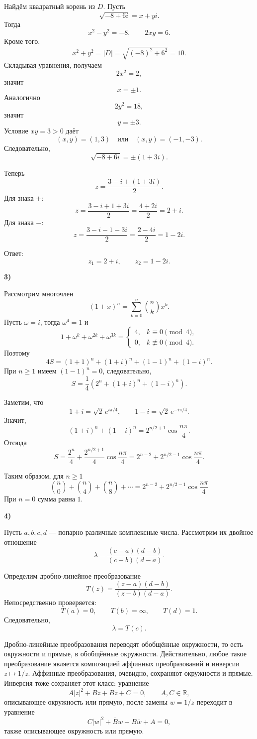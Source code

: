 \documentclass[12pt,a4paper]{article}
\newcommand{\soli}[1]{%
  \par\vspace{0.15\baselineskip}%
  \noindent\textbf{#1)}\ %
  \ignorespaces                     %
}
\begin{document}
Найдём квадратный корень из $D$. Пусть
\[
\sqrt{-8+6i}=x+yi.
\]
Тогда
\[
x^2-y^2=-8,
\qquad
2xy=6.
\]
Кроме того,
\[
x^2+y^2=|D|=\sqrt{(-8)^2+6^2}=10.
\]
Складывая уравнения, получаем
\[
2x^2=2,
\]
значит
\[
x=\pm 1.
\]
Аналогично
\[
2y^2=18,
\]
значит
\[
y=\pm 3.
\]
Условие $xy=3>0$ даёт
\[
(x,y)=(1,3)
\quad\text{или}\quad
(x,y)=(-1,-3).
\]
Следовательно,
\[
\sqrt{-8+6i}=\pm(1+3i).
\]

Теперь
\[
z=\frac{3-i\pm(1+3i)}{2}.
\]
Для знака $+$:
\[
z=\frac{3-i+1+3i}{2}
=
\frac{4+2i}{2}
=
2+i.
\]
Для знака $-$:
\[
z=\frac{3-i-1-3i}{2}
=
\frac{2-4i}{2}
=
1-2i.
\]

Ответ:
\[
\boxed{
z_1=2+i,
\qquad
z_2=1-2i.
}
\]

\soli{3}

Рассмотрим многочлен
\[
(1+x)^n=\sum_{k=0}^n \binom nk x^k.
\]
Пусть $\omega=i$, тогда $\omega^4=1$ и
\[
1+\omega^k+\omega^{2k}+\omega^{3k}
=
\begin{cases}
4,& k\equiv 0\pmod 4,\\
0,& k\not\equiv 0\pmod 4.
\end{cases}
\]
Поэтому
\[
4S
=
(1+1)^n+(1+i)^n+(1-1)^n+(1-i)^n.
\]
При $n\ge 1$ имеем $(1-1)^n=0$, следовательно,
\[
S=\frac14\left(2^n+(1+i)^n+(1-i)^n\right).
\]

Заметим, что
\[
1+i=\sqrt2\, e^{i\pi/4},
\qquad
1-i=\sqrt2\, e^{-i\pi/4}.
\]
Значит,
\[
(1+i)^n+(1-i)^n
=
2^{n/2+1}\cos\frac{n\pi}{4}.
\]
Отсюда
\[
S
=
\frac{2^n}{4}
+
\frac{2^{n/2+1}}{4}\cos\frac{n\pi}{4}
=
2^{n-2}
+
2^{n/2-1}\cos\frac{n\pi}{4}.
\]

Таким образом, для $n\ge 1$
\[
\boxed{
\binom n0+\binom n4+\binom n8+\cdots
=
2^{n-2}+2^{n/2-1}\cos\frac{n\pi}{4}
}
\]
При $n=0$ сумма равна $1$.

\newpage

\soli{4}

Пусть $a,b,c,d$ — попарно различные комплексные числа. Рассмотрим их двойное отношение
\[
\lambda=\frac{(c-a)(d-b)}{(c-b)(d-a)}.
\]

Определим дробно-линейное преобразование
\[
T(z)=\frac{(z-a)(d-b)}{(z-b)(d-a)}.
\]
Непосредственно проверяется:
\[
T(a)=0,\qquad T(b)=\infty,\qquad T(d)=1.
\]
Следовательно,
\[
\lambda=T(c).
\]

Дробно-линейные преобразования переводят обобщённые окружности, то есть окружности и прямые, в обобщённые окружности. Действительно, любое такое преобразование является композицией аффинных преобразований и инверсии $z\mapsto 1/z$. Аффинные преобразования, очевидно, сохраняют окружности и прямые. Инверсия тоже сохраняет этот класс: уравнение
\[
A|z|^2+\overline B z+B\overline z+C=0,\qquad A,C\in\mathbb R,
\]
описывающее окружность или прямую, после замены $w=1/z$ переходит в уравнение
\[
C|w|^2+\overline B w+B\overline w+A=0,
\]
также описывающее окружность или прямую.
\end{document}
